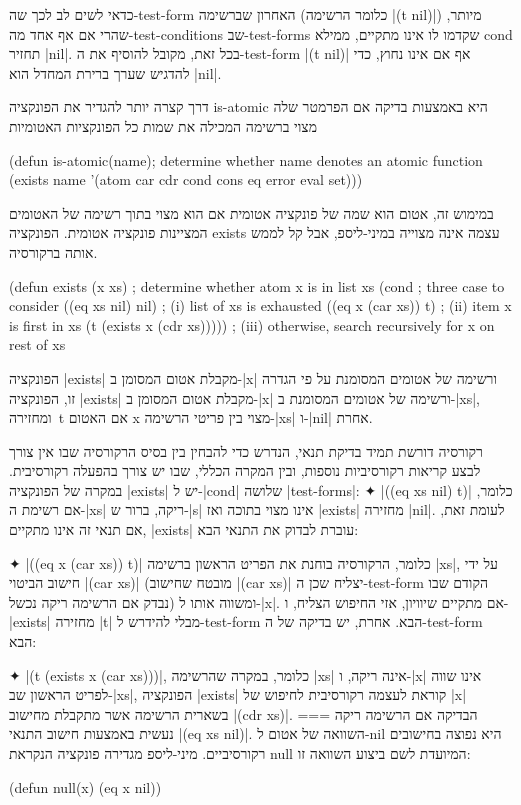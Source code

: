 כדאי לשים לב לכך שה-test-form האחרון שברשימה (כלומר הרשימה \T|(t nil)|) מיותר,
שהרי אם אף אחד מה-test-conditions שב-test-forms שקדמו לו אינו מתקיים, ממילא
cond תחזיר \E|nil|. בכל זאת, מקובל להוסיף את ה-test-form \T|(t nil)| אף אם אינו
נחוץ, כדי להדגיש שערך ברירת המחדל הוא \E|nil|.

דרך קצרה יותר להגדיר את הפונקציה is-atomic היא באמצעות בדיקה אם הפרמטר
שלה מצוי ברשימה המכילה את שמות כל הפונקציות האטומיות
\begin{KERNEL}
(defun is-atomic(name); determine whether name denotes an atomic function
  (exists name '(atom car cdr cond cons eq error eval set)))
\end{KERNEL}
במימוש זה, אטום הוא שמה של פונקציה אטומית אם הוא מצוי בתוך רשימה של האטומים
המציינות פונקציה אטומית. הפונקציה exists עצמה אינה מצוייה במיני-ליספ, אבל
קל לממש אותה ברקורסיה.
\begin{LISP}
(defun exists (x xs) ; determine whether atom x is in list xs
  (cond ; three case to consider
    ((eq xs nil) nil) ; (i) list of xs is exhausted
    ((eq x (car xs)) t) ; (ii) item x is first in xs
    (t (exists x (cdr xs))))) ; (iii) otherwise, search recursively for x on rest of xs
\end{LISP}
הפונקציה \T|exists| מקבלת אטום המסומן ב-\T|x| ורשימה של אטומים המסומנת
על פי הגדרה זו, הפונקציה \T|exists| מקבלת אטום המסומן ב-\T|x| ורשימה של אטומים
המסומנת ב-\T|xs|, ומחזירה~t אם האטום x מצוי בין פריטי הרשימה-\T|xs| ו-\T|nil|
אחרת.

רקורסיה דורשת תמיד בדיקת תנאי, הנדרש כדי להבחין בין בסיס הרקורסיה שבו אין צורך
לבצע קריאות רקורסיביות נוספות, ובין המקרה הכללי, שבו יש צורך בהפעלה רקורסיבית.
במקרה של הפונקציה \T|exists| יש ל-\T|cond| שלושה \E|test-forms|:
✦ \T|((eq xs nil) t)| כלומר, אם רשימת ה-\T|xs| ריקה, ברור ש-\T|s| אינו מצוי
בתוכה ואז \T|exists| מחזירה \T|nil|. לעומת זאת, אם תנאי זה אינו מתקיים,
\T|exists| עוברת לבדוק את התנאי הבא:

✦ \T|((eq x (car xs)) t)| כלומר, הרקורסיה בוחנת את הפריט הראשון ברשימה \T|xs|,
על ידי חישוב הביטוי \T|(car xs)| (מובטח שחישוב \T|(car xs)| יצליח שכן
ה-test-form הקודם שבו נבדק אם הרשימה ריקה נכשל) ומשווה אותו ל-\T|x|. אם מתקיים
שיוויון, אזי החיפוש הצליח, ו-\T|exists| מחזירה \T|t| מבלי להידרש ל-test-form
הבא. אחרת, יש בדיקה של ה-test-form הבא:

✦ \T|(t (exists x (car xs)))|, כלומר, במקרה שהרשימה \T|xs| אינה ריקה, ו-\T|x|
אינו שווה לפריט הראשון שב-\T|xs|, הפונקציה \T|exists| קוראת לעצמה רקורסיבית
לחיפוש של \T|x| בשארית הרשימה אשר מתקבלת מחישוב \T|(cdr xs)|.
===
הבדיקה אם הרשימה ריקה נעשית באמצעות חישוב התנאי \T|(eq xs nil)|. השוואה של
אטום ל-nil היא נפוצה בחישובים רקורסיביים. מיני-ליספ מגדירה פונקציה הנקראת null
המיועדת לשם ביצוע השוואה זו:
\begin{LIBRARY}
(defun null(x) (eq x nil))
\end{LIBRARY}

